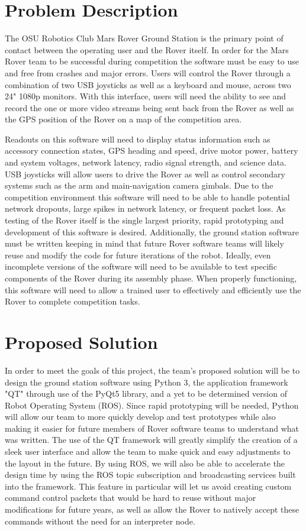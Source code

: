 \documentclass[onecolumn, draftclsnofoot, 10pt, compsoc]{IEEEtran}
\begin{document}
\section{Problem Description}\par
The OSU Robotics Club Mars Rover Ground Station is the primary point of contact between the operating user and the Rover itself.
In order for the Mars Rover team to be successful during competition the software must be easy to use and free from crashes and major errors.
Users will control the Rover through a combination of two USB joysticks as well as a keyboard and mouse, across two 24" 1080p monitors.
With this interface, users will need the ability to see and record the one or more video streams being sent back from the Rover as well as the GPS position of the Rover on a map of the competition area.
\par
Readouts on this software will need to display status information such as accessory connection states, GPS heading and speed, drive motor power, battery and system voltages, network latency, radio signal strength, and science data. 
USB joysticks will allow users to drive the Rover as well as control secondary systems such as the arm and main-navigation camera gimbals. 
Due to the competition environment this software will need to be able to handle potential network dropouts, large spikes in network latency, or frequent packet loss. 
As testing of the Rover itself is the single largest priority, rapid prototyping and development of this software is desired.
Additionally, the ground station software must be written keeping in mind that future Rover software teams will likely reuse and modify the code for future iterations of the robot.
Ideally, even incomplete versions of the software will need to be available to test specific components of the Rover during its assembly phase. 
When properly functioning, this software will need to allow a trained user to effectively and efficiently use the Rover to complete competition tasks.

\section{Proposed Solution}
In order to meet the goals of this project, the team's proposed solution will be to design the ground station software using Python 3, the application framework "QT" through use of the PyQt5 library, and a yet to be determined version of Robot Operating System (ROS). 
Since rapid prototyping will be needed, Python will allow our team to more quickly develop and test prototypes while also making it easier for future members of Rover software teams to understand what was written. 
The use of the QT framework will greatly simplify the creation of a sleek user interface and allow the team to make quick and easy adjustments to the layout in the future. 
By using ROS, we will also be able to accelerate the design time by using the ROS topic subscription and broadcasting services built into the framework. 
This feature in particular will let us avoid creating custom command control packets that would be hard to reuse without major modifications for future years, as well as allow the Rover to natively accept these commands without the need for an interpreter node.
\end{document}
